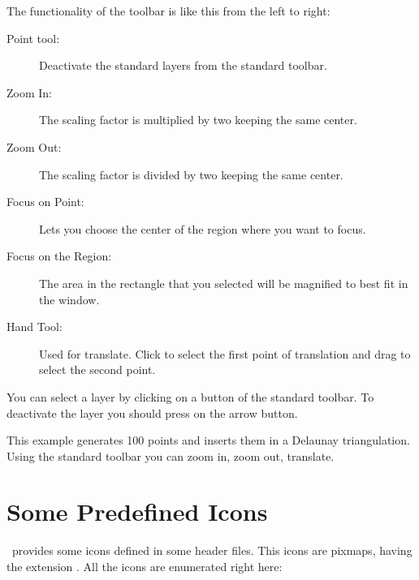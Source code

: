 The functionality of the toolbar is like this from the left to right:
\begin{description}
        \item[Point tool:] Deactivate the standard layers from the
standard toolbar.
        \item[Zoom In:] The scaling factor is multiplied by two
keeping the same center.
        \item[Zoom Out:] The scaling factor is divided by two keeping
the same center.
        \item[Focus on Point:] Lets you choose the center of the
region where you want to focus.
        \item[Focus on the Region:] The area in the rectangle that you selected will be magnified to best fit in the window.
        \item[Hand Tool:] Used for translate. Click to select the
first point of translation and drag to select the second point.
\end{description}

You can select a layer by clicking on a button of the standard
toolbar. To deactivate the layer you should press on the arrow button.

\ccExample
{}

This example generates 100 points and inserts them in a Delaunay
triangulation. Using the standard toolbar you can zoom in, zoom out,
translate.

\section{Some Predefined Icons}
\label{The predefined icons}

\cgal\ provides some icons defined in some header files. This icons are
pixmaps, having the extension . All the icons are enumerated right
here:








